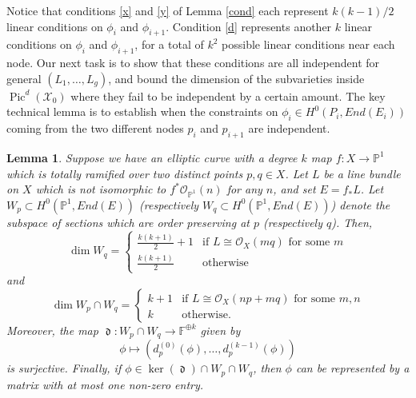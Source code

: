 \documentclass[12pt]{amsart}
\newcommand{\cc}{\mathbb{F}}
\newcommand{\pp}{\mathbb{P}}
\newcommand{\X}{\mathcal{X}}
\renewcommand{\O}{\mathscr{O}}
\newtheorem{Lemma}[theorem]{Lemma}
\DeclareMathOperator{\Pic}{Pic}
\DeclareMathOperator{\diag}{\mathfrak{d}}
\theoremstyle{definition}
\theoremstyle{remark}
\theoremstyle{remark}
\numberwithin{equation}{section}
\begin{document}
 Notice that conditions \eqref{x} and \eqref{y} of Lemma \ref{cond}  each represent $k(k-1)/2$ linear conditions on $\phi_i$ and $\phi_{i+1}$. Condition \eqref{d} represents another $k$ linear conditions on $\phi_i$ and $\phi_{i+1}$, for a total of $k^2$ possible linear conditions near each node. Our next task is to show that these conditions are all independent for general $(L_1, \ldots, L_g)$, and bound the dimension of the subvarieties inside $\Pic^d(\X_0)$ where they fail to be independent by a certain amount.
 The key technical lemma is to establish when the constraints on $\phi_i \in H^0(P_i, End(E_i))$ coming from the two different nodes $p_i$ and $p_{i+1}$ are independent.
   
 \begin{Lemma} \label{zing}
Suppose we have an elliptic curve with a degree $k$ map $f\colon  X \rightarrow \pp^1$ which is totally ramified over two distinct points $p, q \in X$. Let $L$ be a line bundle on $X$ which is not isomorphic to $f^*\O_{\pp^1}(n)$ for any $n$, and set $E = f_*L$. 
 Let $W_p \subset H^0(\pp^1,End(E))$ (respectively $W_q \subset H^0(\pp^1, End(E))$) denote the subspace of sections which are order preserving at $p$ (respectively $q$).
 Then, 
 \[\dim W_q = \begin{cases} \frac{k(k+1)}{2} + 1 & \text{if $L \cong \O_X(mq)$ for some $m$} \\ \frac{k(k+1)}{2} & \text{otherwise}\end{cases}\]
 and
 \[\dim W_p \cap W_q = \begin{cases} k+1 & \text{if $L \cong \O_X(n p+ m q)$ for some $m, n$} \\ k & \text{otherwise}. \end{cases} \]
 Moreover, the map $\diag: W_p \cap W_q \rightarrow \cc^{\oplus k}$ given by
 \begin{equation} \label{map}
 \phi \mapsto \left(d_{p}^{(0)}(\phi), \ldots, d_{p}^{(k-1)}(\phi)\right)
 \end{equation}
 is surjective. Finally, if $\phi \in \ker(\diag) \cap W_p \cap W_q$, then $\phi$ can be represented by a matrix with at most one non-zero entry.
 \end{Lemma}
\end{document}
